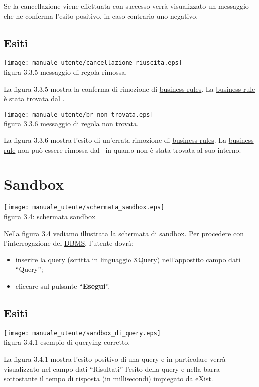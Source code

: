 Se la cancellazione viene effettuata con successo verr\`a visualizzato un messaggio che ne conferma l'esito positivo, in caso contrario uno negativo.
\subsection{Esiti}
 
\begin{center}
\texttt{[image: manuale\_utente/cancellazione\_riuscita.eps]}\\
figura 3.3.5 messaggio di regola rimossa.
\end{center} 
La figura 3.3.5 mostra la conferma di rimozione di \underline{business rules}. La \underline{business rule} \`e stata trovata dal \rp.

\begin{center}
\texttt{[image: manuale\_utente/br\_non\_trovata.eps]}\\
 figura 3.3.6 messaggio di regola non trovata.
\end{center} 
La figura 3.3.6 mostra l'esito di un'errata rimozione di \underline{business rules}. La \underline{business rule} non pu\`o essere rimossa dal \rp\ in quanto non \`e stata trovata al suo interno.

\section{Sandbox}
\begin{center}
 \texttt{[image: manuale\_utente/schermata\_sandbox.eps]} \\
 figura 3.4: schermata sandbox
\end{center}
Nella figura 3.4 vediamo illustrata la schermata di \underline{sandbox}. Per procedere con l'interrogazione del \underline{DBMS}, l'utente dovr\`a:
\begin{itemize}
\item inserire la query (scritta in linguaggio \underline{XQuery}) nell'appostito campo dati ``Query'';
\item cliccare sul pulsante ``\textbf{Esegui}''.
\end{itemize}

\subsection{Esiti}
\begin{center}
\texttt{[image: manuale\_utente/sandbox\_di\_query.eps]}\\
 figura 3.4.1 esempio di querying corretto.
\end{center}
La figura 3.4.1 mostra l'esito positivo di una query e in particolare verr\`a visualizzato nel campo dati ``Risultati'' l'esito della query e nella barra sottostante il tempo di risposta (in millisecondi) impiegato da \underline{eXist}. 

